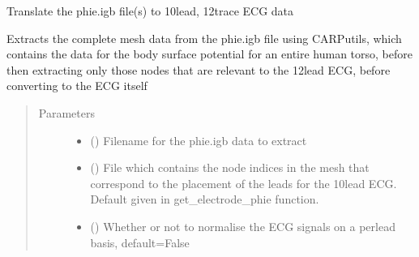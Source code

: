 \documentclass[letterpaper,10pt,english]{sphinxmanual}
\begin{document}
\begin{fulllineitems}
\label{\detokenize{_autosummary/signalanalysis.ecg.read_ecg_from_igb:signalanalysis.ecg.read_ecg_from_igb}}
\sphinxAtStartPar
Translate the phie.igb file(s) to 10\sphinxhyphen{}lead, 12\sphinxhyphen{}trace ECG data

\sphinxAtStartPar
Extracts the complete mesh data from the phie.igb file using CARPutils, which contains the data for the body
surface potential for an entire human torso, before then extracting only those nodes that are relevant to the
12\sphinxhyphen{}lead ECG, before converting to the ECG itself
\begin{quote}\begin{description}
\item[{Parameters}] \leavevmode\begin{itemize}
\item {} 
\sphinxAtStartPar
{} () \textendash{} Filename for the phie.igb data to extract

\item {} 
\sphinxAtStartPar
{} (\sphinxstyleliteralemphasis{\sphinxupquote{, }}) \textendash{} File which contains the node indices in the mesh that correspond to the placement of the leads for the
10\sphinxhyphen{}lead ECG. Default given in get\_electrode\_phie function.

\item {} 
\sphinxAtStartPar
{} (\sphinxstyleliteralemphasis{\sphinxupquote{, }}) \textendash{} Whether or not to normalise the ECG signals on a per\sphinxhyphen{}lead basis, default=False


\end{itemize}
\end{description}
\end{quote}
\end{fulllineitems}
\end{document}
